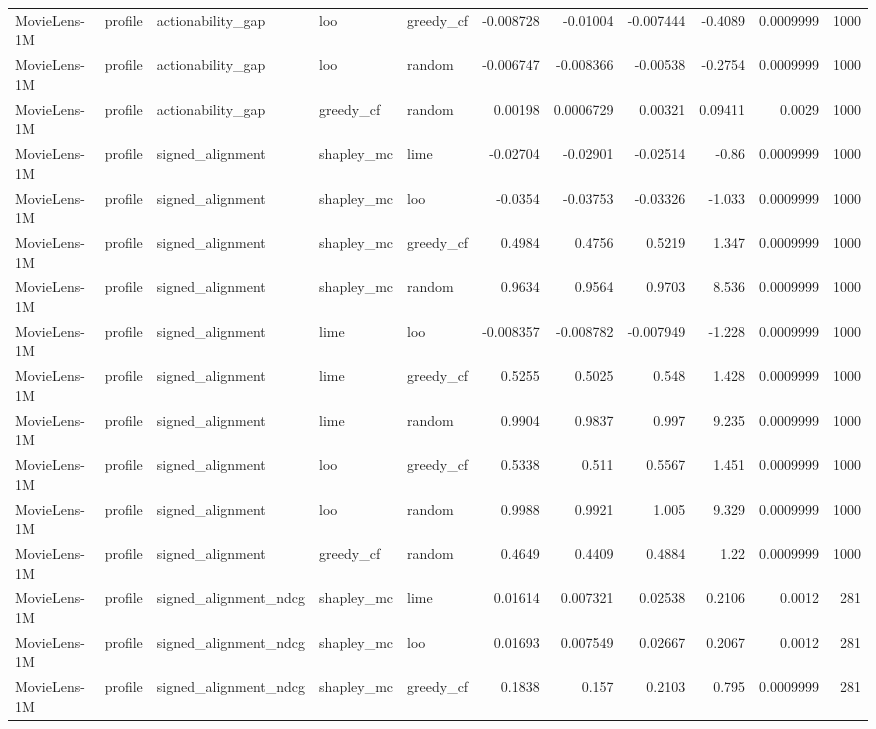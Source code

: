 \begin{table}[t]
\begin{tabular}{lllllrrrrrr}
MovieLens-1M & profile & actionability\_gap & loo & greedy\_cf & -0.008728 & -0.01004 & -0.007444 & -0.4089 & 0.0009999 & 1000 \\
MovieLens-1M & profile & actionability\_gap & loo & random & -0.006747 & -0.008366 & -0.00538 & -0.2754 & 0.0009999 & 1000 \\
MovieLens-1M & profile & actionability\_gap & greedy\_cf & random & 0.00198 & 0.0006729 & 0.00321 & 0.09411 & 0.0029 & 1000 \\
MovieLens-1M & profile & signed\_alignment & shapley\_mc & lime & -0.02704 & -0.02901 & -0.02514 & -0.86 & 0.0009999 & 1000 \\
MovieLens-1M & profile & signed\_alignment & shapley\_mc & loo & -0.0354 & -0.03753 & -0.03326 & -1.033 & 0.0009999 & 1000 \\
MovieLens-1M & profile & signed\_alignment & shapley\_mc & greedy\_cf & 0.4984 & 0.4756 & 0.5219 & 1.347 & 0.0009999 & 1000 \\
MovieLens-1M & profile & signed\_alignment & shapley\_mc & random & 0.9634 & 0.9564 & 0.9703 & 8.536 & 0.0009999 & 1000 \\
MovieLens-1M & profile & signed\_alignment & lime & loo & -0.008357 & -0.008782 & -0.007949 & -1.228 & 0.0009999 & 1000 \\
MovieLens-1M & profile & signed\_alignment & lime & greedy\_cf & 0.5255 & 0.5025 & 0.548 & 1.428 & 0.0009999 & 1000 \\
MovieLens-1M & profile & signed\_alignment & lime & random & 0.9904 & 0.9837 & 0.997 & 9.235 & 0.0009999 & 1000 \\
MovieLens-1M & profile & signed\_alignment & loo & greedy\_cf & 0.5338 & 0.511 & 0.5567 & 1.451 & 0.0009999 & 1000 \\
MovieLens-1M & profile & signed\_alignment & loo & random & 0.9988 & 0.9921 & 1.005 & 9.329 & 0.0009999 & 1000 \\
MovieLens-1M & profile & signed\_alignment & greedy\_cf & random & 0.4649 & 0.4409 & 0.4884 & 1.22 & 0.0009999 & 1000 \\
MovieLens-1M & profile & signed\_alignment\_ndcg & shapley\_mc & lime & 0.01614 & 0.007321 & 0.02538 & 0.2106 & 0.0012 & 281 \\
MovieLens-1M & profile & signed\_alignment\_ndcg & shapley\_mc & loo & 0.01693 & 0.007549 & 0.02667 & 0.2067 & 0.0012 & 281 \\
MovieLens-1M & profile & signed\_alignment\_ndcg & shapley\_mc & greedy\_cf & 0.1838 & 0.157 & 0.2103 & 0.795 & 0.0009999 & 281 \\

\end{tabular}
\end{table}
